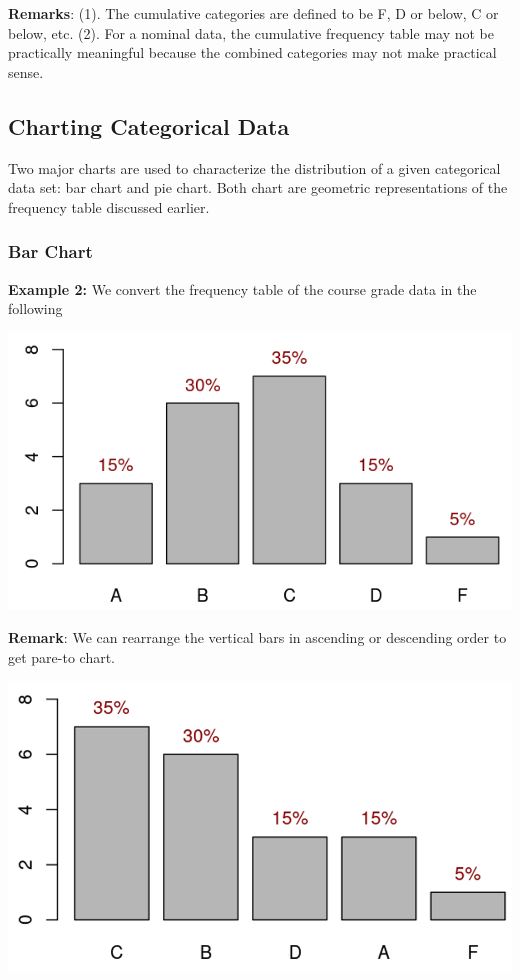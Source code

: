 \documentclass[
]{book}
\begin{document}
\textbf{Remarks}: (1). The cumulative categories are defined to be F, D or below, C or below, etc. (2). For a nominal data, the cumulative frequency table may not be practically meaningful because the combined categories may not make practical sense.

\hypertarget{charting-categorical-data}{%
\subsection{Charting Categorical Data}\label{charting-categorical-data}}

Two major charts are used to characterize the distribution of a given categorical data set: bar chart and pie chart. Both chart are geometric representations of the frequency table discussed earlier.

\hypertarget{bar-chart}{%
\subsubsection{Bar Chart}\label{bar-chart}}

\textbf{Example 2:} We convert the frequency table of the course grade data in the following

\begin{center}\includegraphics[width=0.6\linewidth]{week01/barChart} \end{center}

\textbf{Remark}: We can rearrange the vertical bars in ascending or descending order to get pare-to chart.

\begin{center}\includegraphics[width=0.6\linewidth]{week01/paretoChart} \end{center}
\end{document}
